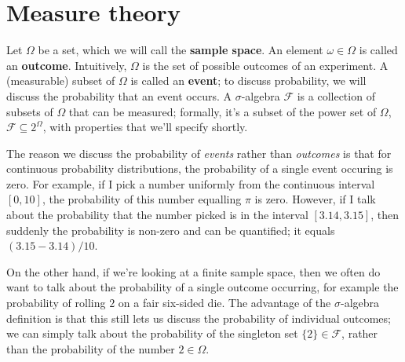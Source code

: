 \newpage
\section{Measure theory}

Let $\Omega$ be a set, which we will call the \textbf{sample space}. An element $\omega\in\Omega$ is called an \textbf{outcome}. Intuitively, $\Omega$ is the set of possible outcomes of an experiment. A (measurable) subset of $\Omega$ is called an \textbf{event}; to discuss probability, we will discuss the probability that an event occurs. A $\sigma$-algebra $\mathcal F$ is a collection of subsets of $\Omega$ that can be measured; formally, it's a subset of the power set of $\Omega$, $\mathcal F\subseteq 2^\Omega$, with properties that we'll specify shortly. 

\begin{example}
The reason we discuss the probability of \textit{events} rather than \textit{outcomes} is that for continuous probability distributions, the probability of a single event occuring is zero. For example, if I pick a number uniformly from the continuous interval $[0, 10]$, the probability of this number equalling $\pi$ is zero. However, if I talk about the probability that the number picked is in the interval $[3.14, 3.15]$, then suddenly the probability is non-zero and can be quantified; it equals $(3.15 - 3.14) / 10$. 

On the other hand, if we're looking at a finite sample space, then we often do want to talk about the probability of a single outcome occurring, for example the probability of rolling $2$ on a fair six-sided die. The advantage of the $\sigma$-algebra definition is that this still lets us discuss the probability of individual outcomes; we can simply talk about the probability of the singleton set $\{2\}\in \mathcal F$, rather than the probability of the number $2\in\Omega$. 
\end{example}

